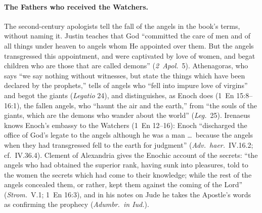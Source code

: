 \paragraph{The Fathers who received the Watchers.} The second-century
apologists tell the fall of the angels in the book's terms, without naming
it. Justin teaches that God ``committed the care of men and of all things
under heaven to angels whom He appointed over them. But the angels
transgressed this appointment, and were captivated by love of women, and
begat children who are those that are called demons'' (\emph{2~Apol.}\ 5).
Athenagoras, who says ``we say nothing without witnesses, but state the
things which have been declared by the prophets,'' tells of angels who ``fell
into impure love of virgins'' and begot the giants (\emph{Legatio} 24), and
distinguishes, as Enoch does (1~En 15:8--16:1), the fallen angels, who
``haunt the air and the earth,'' from ``the souls of the giants, which are
the demons who wander about the world'' (\emph{Leg.}\ 25).
Irenaeus knows Enoch's embassy to the Watchers (1~En 12--16): Enoch
``discharged the office of God's legate to the angels although he was a man
\dots\ because the angels when they had transgressed fell to the earth for
judgment'' (\emph{Adv.\ haer.}\ IV.16.2; cf.\ IV.36.4). Clement of Alexandria gives
the Enochic account of the secrets: ``the angels who had obtained the superior rank, having sunk into
pleasures, told to the women the secrets which had come to their knowledge;
while the rest of the angels concealed them, or rather, kept them against
the coming of the Lord'' (\emph{Strom.}\ V.1; 1~En 16:3), and in his notes on
Jude he takes the Apostle's words as confirming the prophecy
(\emph{Adumbr.\ in Iud.}).

